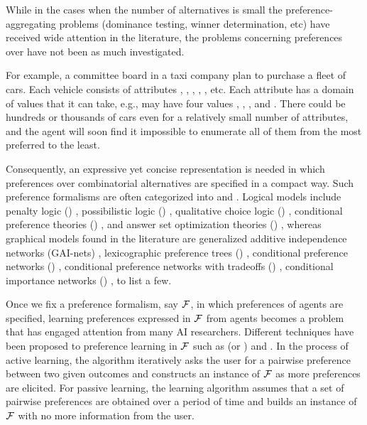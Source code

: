 While in the cases when the
number of alternatives is small the preference-aggregating 
problems (dominance testing, winner determination,
etc) have received wide attention in the literature,
the problems concerning preferences over  have not been as much investigated.

For example, a committee board in a taxi company plan to purchase a fleet of
cars.
Each vehicle consists of attributes , ,
, , , etc.  
Each attribute has a domain of values that it can take, e.g.,
 may have four values , , , and .
There could be hundreds or thousands of cars even for
a relatively small number of attributes, and
the agent will soon find it impossible to enumerate all of
them from the most preferred to the least.

Consequently, an expressive yet concise representation is needed in which
preferences over combinatorial alternatives are specified
in a compact way.
Such preference formalisms are often categorized into  and
.
Logical models include penalty logic () \cite{haddawy1992representations}, 
possibilistic logic () \cite{DuboisLP91},
qualitative choice logic () \cite{brewka2004qualitative},
conditional preference theories () \cite{Wilson04extendingcp-nets},
and answer set optimization theories () \cite{Brewka:ASO},
whereas graphical models found in the literature are
generalized additive independence networks (GAI-nets) \cite{BacchusG95,LIP61766},
lexicographic preference trees () \cite{booth:learningLP,conf/adt13/LiuT},
conditional preference networks () \cite{Kaci:Pref},
conditional preference networks with tradeoffs () \cite{BrafmanD02:TCP},
conditional importance networks () \cite{Kaci:Pref},
to list a few.

Once we fix a preference formalism, say $\mathcal{F}$, in which preferences of agents
are specified, learning preferences expressed in $\mathcal{F}$ from agents
becomes a problem that has engaged attention from many AI researchers.
Different techniques have been proposed to preference learning
in $\mathcal{F}$
such as  (or ) and 
 \cite{Furnkranz:pref_learning}.
In the process of
active learning, the algorithm iteratively asks the user for a pairwise 
preference between two given outcomes and constructs
an instance of $\mathcal{F}$ as more preferences are elicited.
For passive learning, the learning algorithm assumes that a set of
pairwise preferences are obtained over a period of time and builds an instance
of $\mathcal{F}$ with no more information from the user.

